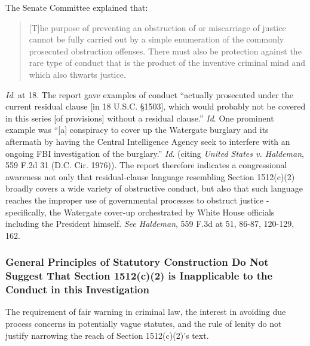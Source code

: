 The Senate Committee explained that:

\begin{quote}
[T]he purpose of preventing an obstruction of or miscarriage of justice cannot be fully carried out by a simple enumeration of the commonly prosecuted obstruction offenses.
There must also be protection against the rare type of conduct that is the product of the inventive criminal mind and which also thwarts justice.
\end{quote}

\textit{Id}. at 18.
The report gave examples of conduct “actually prosecuted under the current residual clause [in 18 U.S.C. \S 1503], which would probably not be covered in this series [of provisions] without a residual clause.”
\textit{Id}.
One prominent example was “[a] conspiracy to cover up the Watergate burglary and its aftermath by having the Central Intelligence Agency seek to interfere with an ongoing FBI investigation of the burglary.”
\textit{Id}. (citing \textit{United States v. Haldeman}, 559 F.2d 31 (D.C. Cir. 1976)).
The report therefore indicates a congressional awareness not only that residual-clause language resembling Section 1512(c)(2) broadly covers a wide variety of obstructive conduct, but also that such language reaches the improper use of governmental processes to obstruct justice - specifically, the Watergate cover-up orchestrated by White House officials including the President himself.
\textit{See Haldeman}, 559 F.3d at 51, 86-87, 120-129, 162.%

\subsubsection{General Principles of Statutory Construction Do Not Suggest That Section 1512(c)(2) is Inapplicable to the Conduct in this Investigation}

The requirement of fair warning in criminal law, the interest in avoiding due process concerns in potentially vague statutes, and the rule of lenity do not justify narrowing the reach of Section 1512(c)(2)’s text.%

